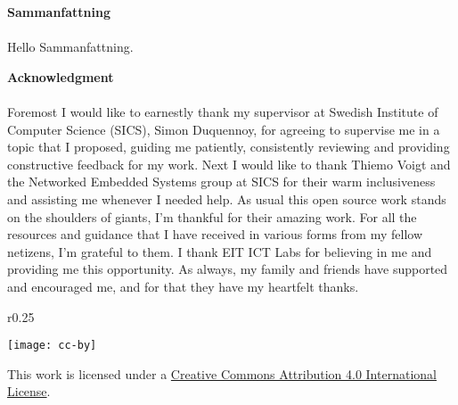 \newpage\null\thispagestyle{empty}\newpage

\thispagestyle{plain}
{}
\huge{\textbf{Sammanfattning}} \\
\normalsize \\
Hello Sammanfattning.
\clearpage

\newpage\null\thispagestyle{empty}\newpage

\thispagestyle{plain}
{}
\huge{\textbf{Acknowledgment}} \\
\normalsize \\
Foremost I would like to earnestly thank my supervisor at Swedish Institute of Computer Science (SICS), Simon Duquennoy, for agreeing to supervise me in a topic that I proposed, guiding me patiently, consistently reviewing and providing constructive feedback for my work. Next I would like to thank Thiemo Voigt and the Networked Embedded Systems group at SICS for their warm inclusiveness and assisting me whenever I needed help. As usual this open source work stands on the shoulders of giants, I'm thankful for their amazing work. For all the resources and guidance that I have received in various forms from my fellow netizens, I'm grateful to them. I thank EIT ICT Labs for believing in me and providing me this opportunity. As always, my family and friends have supported and encouraged me, and for that they have my heartfelt thanks.
\clearpage

\newpage\null\thispagestyle{empty}\newpage

\tableofcontents
\null
\vfill
\begin{wrapfigure}{r}{0.25\textwidth}
\vspace{-30pt}
  \begin{center}
	\texttt{[image: cc-by]}
  \end{center}
\end{wrapfigure}
\noindent
{\large This work is licensed under a \href{http://creativecommons.org/licenses/by/4.0/}{Creative Commons Attribution 4.0 International License}.}


\glsnogroupskiptrue
\renewcommand{\glsnamefont}[1]{\textbf{#1}}
\setlength{\glsdescwidth}{0.8\hsize}
\printglossary[style=long,title=List of Abbreviations,type=\acronymtype]
\clearpage

\listoffigures
\clearpage
{}
\listoftables
\clearpage